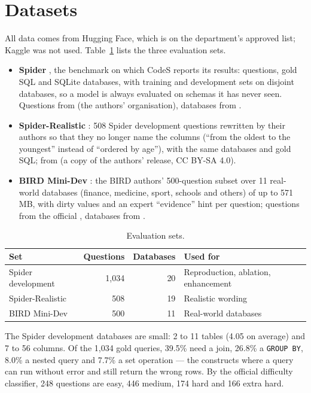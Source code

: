 \section{Datasets}

All data comes from Hugging Face, which is on the department's approved list; Kaggle was not used. Table~\ref{tab:data} lists the three evaluation sets.

\begin{itemize}
	\item \textbf{Spider} \cite{yu2018spider}, the benchmark on which CodeS reports its results: questions, gold SQL and SQLite databases, with training and development sets on disjoint databases, so a model is always evaluated on schemas it has never seen. Questions from  (the authors' organisation), databases from .
	\item \textbf{Spider-Realistic} \cite{deng2020structuregrounded}: 508 Spider development questions rewritten by their authors so that they no longer name the columns (``from the oldest to the youngest'' instead of ``ordered by age''), with the same databases and gold SQL; from  (a copy of the authors' release, CC BY-SA 4.0).
	\item \textbf{BIRD Mini-Dev} \cite{li2023can}: the BIRD authors' 500-question subset over 11 real-world databases (finance, medicine, sport, schools and others) of up to 571\,MB, with dirty values and an expert ``evidence'' hint per question; questions from the official , databases from .
\end{itemize}

\begin{table}[!t]
	\centering
	\caption{Evaluation sets.}
	\label{tab:data}
	\singlespacing
	\begin{tabular}{|l|r|r|l|}
		\hline
		\textbf{Set} & \textbf{Questions} & \textbf{Databases} & \textbf{Used for} \\ \hline
		Spider development & 1,034 & 20 & Reproduction, ablation, enhancement \\ \hline
		Spider-Realistic & 508 & 19 & Realistic wording \\ \hline
		BIRD Mini-Dev & 500 & 11 & Real-world databases \\ \hline
	\end{tabular}
\end{table}

The Spider development databases are small: 2 to 11 tables (4.05 on average) and 7 to 56 columns. Of the 1,034 gold queries, 39.5\% need a join, 26.8\% a \texttt{GROUP BY}, 8.0\% a nested query and 7.7\% a set operation --- the constructs where a query can run without error and still return the wrong rows. By the official difficulty classifier, 248 questions are easy, 446 medium, 174 hard and 166 extra hard.

